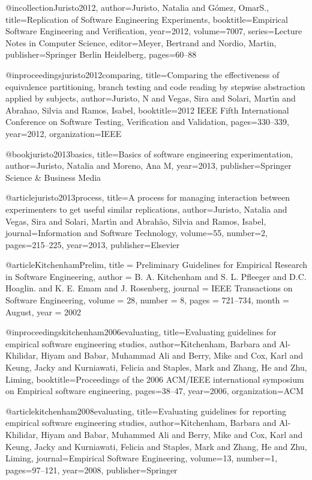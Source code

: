 @incollection{Juristo2012,
	author={Juristo, Natalia and Gómez, OmarS.},
	title={Replication of Software Engineering Experiments},
	booktitle={Empirical Software Engineering and Verification},
	year={2012},
	volume={7007},
	series={Lecture Notes in Computer Science},
	editor={Meyer, Bertrand and Nordio, Martin},
	publisher={Springer Berlin Heidelberg},
	pages={60--88}
}

@inproceedings{juristo2012comparing,
  title={Comparing the effectiveness of equivalence partitioning, branch testing and code reading by stepwise abstraction applied by subjects},
  author={Juristo, N and Vegas, Sira and Solari, Mart{\'\i}n and Abrahao, Silvia and Ramos, Isabel},
  booktitle={2012 IEEE Fifth International Conference on Software Testing, Verification and Validation},
  pages={330--339},
  year={2012},
  organization={IEEE}
}

@book{juristo2013basics,
  title={Basics of software engineering experimentation},
  author={Juristo, Natalia and Moreno, Ana M},
  year={2013},
  publisher={Springer Science \& Business Media}
}

@article{juristo2013process,
  title={A process for managing interaction between experimenters to get useful similar replications},
  author={Juristo, Natalia and Vegas, Sira and Solari, Mart{\'\i}n and Abrah{\~a}o, Silvia and Ramos, Isabel},
  journal={Information and Software Technology},
  volume={55},
  number={2},
  pages={215--225},
  year={2013},
  publisher={Elsevier}
}

@article{KitchenhamPrelim,
title     = {{Preliminary Guidelines for Empirical Research in Software Engineering}},
author    = {B. A. Kitchenham and S. L. Pfleeger and D.C. Hoaglin. and K. E. Emam and J. Rosenberg},
journal   = {IEEE Transactions on Software Engineering},
volume    = {28},
number    = {8},
pages     = {721--734},
month     = {August},
year      = 2002
}
	
@inproceedings{kitchenham2006evaluating,
  title={Evaluating guidelines for empirical software engineering studies},
  author={Kitchenham, Barbara and Al-Khilidar, Hiyam and Babar, Muhammad Ali and Berry, Mike and Cox, Karl and Keung, Jacky and Kurniawati, Felicia and Staples, Mark and Zhang, He and Zhu, Liming},
  booktitle={Proceedings of the 2006 ACM/IEEE international symposium on Empirical software engineering},
  pages={38--47},
  year={2006},
  organization={ACM}
}

@article{kitchenham2008evaluating,
  title={Evaluating guidelines for reporting empirical software engineering studies},
  author={Kitchenham, Barbara and Al-Khilidar, Hiyam and Babar, Muhammed Ali and Berry, Mike and Cox, Karl and Keung, Jacky and Kurniawati, Felicia and Staples, Mark and Zhang, He and Zhu, Liming},
  journal={Empirical Software Engineering},
  volume={13},
  number={1},
  pages={97--121},
  year={2008},
  publisher={Springer}
}

